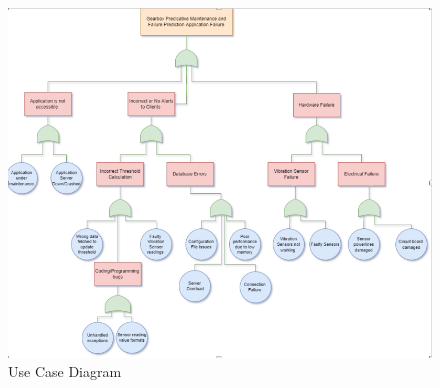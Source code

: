 \label{sec:hazard}
\begin{figure}
	\centering
	\includegraphics[width=1.2\linewidth]{images/hazard-analysis.png}
	\caption{Use Case Diagram}
\end{figure} 